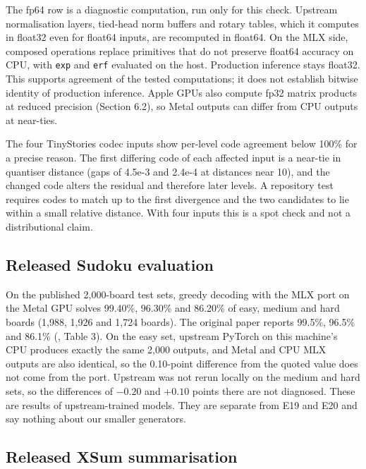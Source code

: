 \documentclass[
  british,
]{article}
\begin{document}
The fp64 row is a diagnostic computation, run only for this check.
Upstream normalisation layers, tied-head norm buffers and rotary tables,
which it computes in float32 even for float64 inputs, are recomputed in
float64. On the MLX side, composed operations replace primitives that do
not preserve float64 accuracy on CPU, with \texttt{exp} and \texttt{erf}
evaluated on the host. Production inference stays float32. This supports
agreement of the tested computations; it does not establish bitwise
identity of production inference. Apple GPUs also compute fp32 matrix
products at reduced precision (Section 6.2), so Metal outputs can differ
from CPU outputs at near-ties.

The four TinyStories codec inputs show per-level code agreement below
100\% for a precise reason. The first differing code of each affected
input is a near-tie in quantiser distance (gaps of 4.5e-3 and 2.4e-4 at
distances near 10), and the changed code alters the residual and
therefore later levels. A repository test requires codes to match up to
the first divergence and the two candidates to lie within a small
relative distance. With four inputs this is a spot check and not a
distributional claim.

\subsection{Released Sudoku
evaluation}\label{released-sudoku-evaluation}

On the published 2,000-board test sets, greedy decoding with the MLX
port on the Metal GPU solves 99.40\%, 96.30\% and 86.20\% of easy,
medium and hard boards (1,988, 1,926 and 1,724 boards). The original
paper reports 99.5\%, 96.5\% and 86.1\% (, Table 3). On the easy set, upstream PyTorch on this
machine's CPU produces exactly the same 2,000 outputs, and Metal and CPU
MLX outputs are also identical, so the 0.10-point difference from the
quoted value does not come from the port. Upstream was not rerun locally
on the medium and hard sets, so the differences of \(-0.20\) and
\(+0.10\) points there are not diagnosed. These are results of
upstream-trained models. They are separate from E19 and E20 and say
nothing about our smaller generators.

\subsection{Released XSum
summarisation}\label{released-xsum-summarisation}
\end{document}
